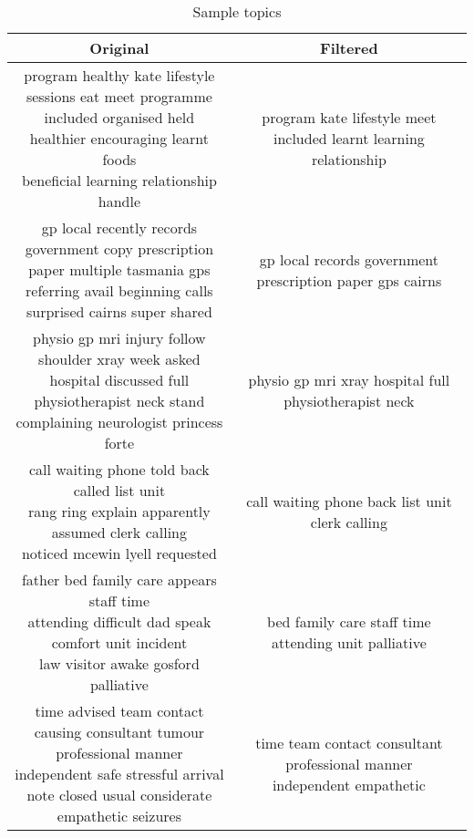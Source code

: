 \documentclass[11pt,twoside]{report}
\begin{document}
\begin{table}[h]
\tiny
\caption{Sample topics}
\centering
\begin{tabular}{|c|c|}
\hline\hline
Original & Filtered\\
\hline
\makecell{program healthy kate lifestyle sessions eat meet programme\\
	 included organised held healthier encouraging learnt foods\\
	 beneficial learning relationship handle} & {program kate lifestyle meet included learnt learning relationship} \\
\hline

\makecell{gp local recently records government copy prescription\\
	 paper multiple tasmania gps referring avail beginning calls\\
	  surprised cairns super shared } & {gp local records government prescription paper gps cairns}\\
\hline

\makecell{physio gp mri injury follow shoulder xray week asked\\
	 hospital discussed full physiotherapist neck stand \\
	 complaining neurologist princess forte} & {physio gp mri xray hospital full physiotherapist neck}\\
\hline

\makecell{call waiting phone told back called list unit\\
	 rang ring explain apparently assumed clerk calling\\
	 noticed mcewin lyell requested} & {call waiting phone back list unit clerk calling}\\
\hline
  
\makecell{father bed family care appears staff time\\
	 attending difficult dad speak comfort unit incident\\
	 law visitor awake gosford palliative} & {bed family care staff time attending unit palliative}\\
\hline
	
\makecell{time advised team contact causing consultant tumour\\
	 professional manner independent safe stressful arrival\\
	 note closed usual considerate empathetic seizures} & \makecell{time team contact consultant professional manner\\ independent empathetic}\\
\hline


\end{tabular}
\end{table}
\end{document}
